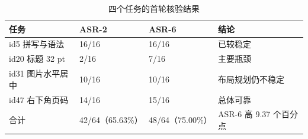 \documentclass[11pt,a4paper,UTF8,fontset=fandol]{ctexart}
\begin{document}
\begin{table}[H]
\centering
\caption{四个任务的首轮核验结果}
\small
\begin{tabularx}{\textwidth}{L{4.4cm} C{2.6cm} C{2.6cm} Y}
\toprule
任务 & ASR-2 & ASR-6 & 结论 \\
\midrule
id5 拼写与语法 & 16/16 & 16/16 & 已较稳定 \\
id20 标题 32 pt & 2/16 & 7/16 & 主要瓶颈 \\
id31 图片水平居中 & 10/16 & 10/16 & 布局规划仍不稳定 \\
id47 右下角页码 & 14/16 & 15/16 & 总体可靠 \\
合计 & 42/64（65.63\%） & 48/64（75.00\%） & ASR-6 高 9.37 个百分点 \\
\bottomrule
\end{tabularx}
\end{table}
\end{document}
